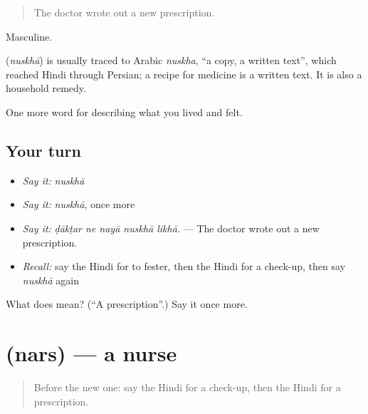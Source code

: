 \begin{quote}
The doctor wrote out a new prescription.
\end{quote}

Masculine.

\begin{cousinweb}
\textbf{} (\emph{nuskhā}) is usually traced to Arabic \emph{nuskha}, \textquotedblleft{}a copy, a written text\textquotedblright{}, which reached Hindi through Persian; a recipe for medicine is a written text. It is also a household remedy.
\end{cousinweb}

\begin{grammarlens}[title={What you've built}]
One more word for describing what you lived and felt.
\end{grammarlens}

\subsection*{Your turn}
\begin{itemize}
\raggedright
  \item \emph{Say it:} \emph{nuskhā}
  \item \emph{Say it:} \emph{nuskhā}, once more
  \item \emph{Say it:} \emph{ḍākṭar ne nayā nuskhā likhā.} — The doctor wrote out a new prescription.
  \item \emph{Recall:} say the Hindi for to fester, then the Hindi for a check-up, then say \emph{nuskhā} again
\end{itemize}

\begin{tcolorbox}[breakable,colback=teal!4,colframe=teal!35!black,title={Before you move on}]
What does  mean? (\textquotedblleft{}A prescription\textquotedblright{}.) Say it once more.
\end{tcolorbox}
\section[\texorpdfstring{\hi{नर्स} (nars)}{नर्स (nars)}]{ (nars) — a nurse}

\label{lesson:HI-C488-nars}



\begin{quote}
Before the new one: say the Hindi for a check-up, then the Hindi for a prescription.
\end{quote}


